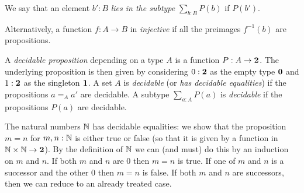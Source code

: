 \begin{definition}
\begin{definition}
We say that an element $b':B$ \emph{lies in the subtype} $\sum_{b:B}P(b)$ if $P(b')$.
\end{definition}
Alternatively, a function $f:A\to B$ in \emph{injective} if all the preimages $f^{-1}(b)$ are propositions.
\begin{definition}
  \label{def:decidableprop}
  A \emph{decidable proposition} depending on a type $A$ is a function $P:A\to\mathbf{2}$.  The underlying proposition is then given by considering $0:\mathbf{2}$ as the empty type $\mathbf{0}$ and $1:\mathbf{2}$ as the singleton $\mathbf{1}$.  A set $A$ is \emph{decidable} (or \emph{has decidable equalities}) if the propositions $a=_Aa'$ are decidable.  A subtype $\sum_{a:A}P(a)$ is \emph{decidable} if the propositions $P(a)$ are decidable. 
\end{definition}
\begin{example}\label{ex:Nisdecidable}
  The natural numbers $\mathbb{N}$ has decidable equalities: we show that the proposition $m=n$ for $m,n:\mathbb{N}$ is either true or false (so that it is given by a function in $\mathbb{N}\times\mathbb{N}\to\mathbf{2}$). By the definition of $\mathbb{N}$ we can (and must) do this by an induction on $m$ and $n$.  If both $m$ and $n$ are $0$ then $m=n$ is true.  If one of $m$ and $n$ is a successor and the other $0$ then $m=n$ is false.  If both $m$ and $n$ are successors, then we can reduce to an already treated case.
\end{example}


\end{definition}

